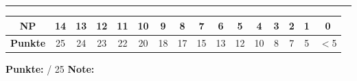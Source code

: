 \documentclass[11pt,a4paper]{article}
\newcommand{\luecke}[1]{\underline{\hspace{#1}}}
\begin{document}
\vspace{1cm}

\hrule
\vspace{0.3cm}

\begin{center}
\begin{tabular}{|c|c|c|c|c|c|c|c|c|c|c|c|c|c|c|c|}
\hline
\textbf{NP} & 14 & 13 & 12 & 11 & 10 & 9 & 8 & 7 & 6 & 5 & 4 & 3 & 2 & 1 & 0 \\
\hline
\textbf{Punkte} & 25 & 24 & 23 & 22 & 20 & 18 & 17 & 15 & 13 & 12 & 10 & 8 & 7 & 5 & $<$5 \\
\hline
\end{tabular}
\end{center}

\vspace{0.5cm}

\begin{flushright}
\textbf{Punkte:} \luecke{1.5cm} / 25 \hspace{1cm} \textbf{Note:} \luecke{1.5cm}
\end{flushright}
\end{document}
